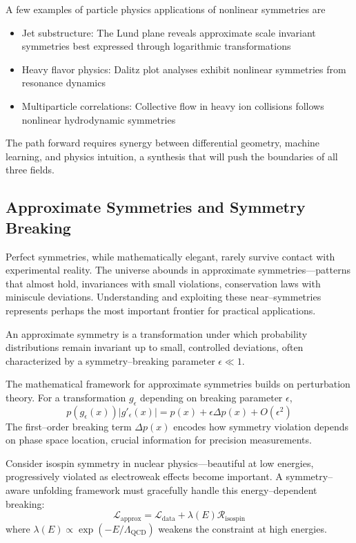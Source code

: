         A few examples of particle physics applications of nonlinear symmetries are
        \begin{itemize}
            \item Jet substructure: The Lund plane reveals approximate scale invariant symmetries best expressed through logarithmic transformations
            \item Heavy flavor physics: Dalitz plot analyses exhibit nonlinear symmetries from resonance dynamics
            \item Multiparticle correlations: Collective flow in heavy ion collisions follows nonlinear hydrodynamic symmetries
        \end{itemize}
        The path forward requires synergy between differential geometry, machine learning, and physics intuition, a synthesis that will push the boundaries of all three fields.
    
    \subsection{Approximate Symmetries and Symmetry Breaking}
        Perfect symmetries, while mathematically elegant, rarely survive contact with experimental reality.
        The universe abounds in approximate symmetries---patterns that almost hold, invariances with small violations, conservation laws with miniscule deviations.
        Understanding and exploiting these near--symmetries represents perhaps the most important frontier for practical applications.
        
        An approximate symmetry is a transformation under which probability distributions remain invariant up to small, controlled deviations, often characterized by a symmetry--breaking parameter \(\epsilon \ll 1\).
        
        The mathematical framework for approximate symmetries builds on perturbation theory.
        For a transformation \(g_\epsilon\) depending on breaking parameter \(\epsilon\),
        \[
            p(g_\epsilon(x)) |g'_\epsilon(x)| = p(x) + \epsilon \Delta p(x) + O(\epsilon^2)
        \]
        The first--order breaking term \(\Delta p(x)\) encodes how symmetry violation depends on phase space location, crucial information for precision measurements.
    
        Consider isospin symmetry in nuclear physics---beautiful at low energies, progressively violated as electroweak effects become important.
        A symmetry--aware unfolding framework must gracefully handle this energy--dependent breaking:
        \[
            \mathcal{L}_{\text{approx}} = \mathcal{L}_{\text{data}} + \lambda(E) \mathcal{R}_{\text{isospin}}
        \]
        where \(\lambda(E) \propto \exp(-E/\Lambda_{\text{QCD}})\) weakens the constraint at high energies.
    
